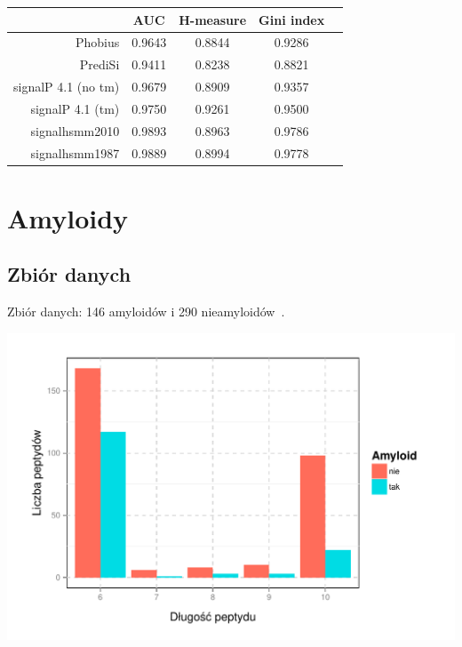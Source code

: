 \documentclass[10pt]{beamer}\usepackage[]{graphicx}\usepackage[]{color}
\makeatletter
\def\maxwidth{ %
  \ifdim\Gin@nat@width>\linewidth
    \linewidth
  \else
    \Gin@nat@width
  \fi
}
\makeatother
\begin{document}
    \begin{frame}
      \begin{table}[ht]
\centering
\begin{tabular}{rcccc}
  \hline
 & AUC & H-measure & Gini index\\ 
  \hline
Phobius & 0.9643 & 0.8844 & 0.9286\\ 
  PrediSi & 0.9411 & 0.8238 & 0.8821\\ 
  signalP 4.1 (no tm) & 0.9679 & 0.8909 & 0.9357\\ 
  signalP 4.1 (tm) & 0.9750 & 0.9261 & 0.9500\\ 
  signalhsmm2010 & 0.9893 & 0.8963 & 0.9786\\ 
  signalhsmm1987 & 0.9889 & 0.8994 & 0.9778\\ 
   \hline
\end{tabular}
\end{table}
    \end{frame}


\section{Amyloidy}

\subsection{Zbiór danych}

\begin{frame}

Zbiór danych: 146 amyloidów i 290 nieamyloidów~\citep{kotulska2014}.


\includegraphics[width=\maxwidth]{figure/unnamed-chunk-11-1} 



\end{frame}
\end{document}
